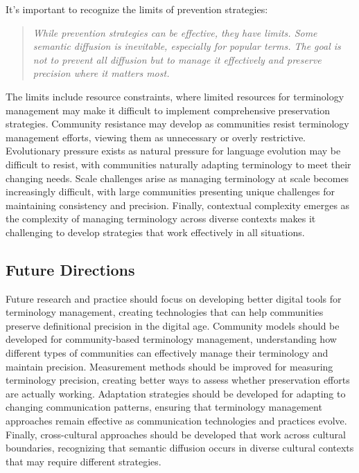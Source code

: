 \documentclass[11pt]{article}
\begin{document}
It's important to recognize the limits of prevention strategies:

\begin{quote}
\emph{While prevention strategies can be effective, they have limits. Some semantic diffusion is inevitable, especially for popular terms. The goal is not to prevent all diffusion but to manage it effectively and preserve precision where it matters most.}
\end{quote}

The limits include resource constraints, where limited resources for terminology management may make it difficult to implement comprehensive preservation strategies. Community resistance may develop as communities resist terminology management efforts, viewing them as unnecessary or overly restrictive. Evolutionary pressure exists as natural pressure for language evolution may be difficult to resist, with communities naturally adapting terminology to meet their changing needs. Scale challenges arise as managing terminology at scale becomes increasingly difficult, with large communities presenting unique challenges for maintaining consistency and precision. Finally, contextual complexity emerges as the complexity of managing terminology across diverse contexts makes it challenging to develop strategies that work effectively in all situations.

\subsection{Future Directions}

Future research and practice should focus on developing better digital tools for terminology management, creating technologies that can help communities preserve definitional precision in the digital age. Community models should be developed for community-based terminology management, understanding how different types of communities can effectively manage their terminology and maintain precision. Measurement methods should be improved for measuring terminology precision, creating better ways to assess whether preservation efforts are actually working. Adaptation strategies should be developed for adapting to changing communication patterns, ensuring that terminology management approaches remain effective as communication technologies and practices evolve. Finally, cross-cultural approaches should be developed that work across cultural boundaries, recognizing that semantic diffusion occurs in diverse cultural contexts that may require different strategies.
\end{document}
